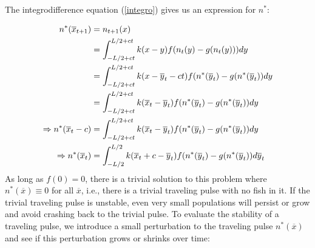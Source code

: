\documentclass[12pt,english]{article}
\begin{document}
The integrodifference equation (\ref{integro}) gives us an expression for $n^*$:

\begin{align}
n^*(\overline{x}_{t+1})&=n_{t+1}(x) \notag
\\ &=\int_{-L/2+ct}^{L/2+ct}k(x-y)f(n_t(y)-g(n_t(y)))dy \notag
\\ &=\int_{-L/2+ct}^{L/2+ct}k(x-\overline{y}_t-ct)f(n^*(\overline{y}_t)-g(n^*(\overline{y}_t))dy \notag
\\ &=\int_{-L/2+ct}^{L/2+ct}k(\overline{x}_t-\overline{y}_t)f(n^*(\overline{y}_t)-g(n^*(\overline{y}_t))dy \notag
\\ \Rightarrow n^*(\overline{x}_t-c)&=\int_{-L/2+ct}^{L/2+ct}k(\overline{x}_t-\overline{y}_t)f(n^*(\overline{y}_t)-g(n^*(\overline{y}_t))dy \notag
\\ \Rightarrow n^*(\overline{x}_t)&=\int_{-L/2}^{L/2}k(\overline{x}_t+c-\overline{y}_t)f(n^*(\overline{y}_t)-g(n^*(\overline{y}_t))d\overline y_t  \label{pulse}
\end{align}
As long as $f(0)=0$, there is a trivial solution to this problem where $n^*(\overline{x})\equiv 0$ for all $\overline{x}$, i.e., there is a trivial traveling pulse with no fish in it.  If the trivial traveling pulse is unstable, even very small populations will persist or grow and avoid crashing back to the trivial pulse.  To evaluate the stability of a traveling pulse, we introduce a small perturbation to the traveling pulse $n^*(\overline{x})$ and see if this perturbation grows or shrinks over time:
\end{document}
